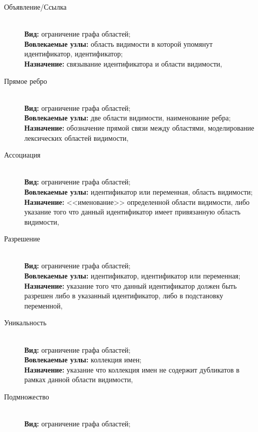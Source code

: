 \begin{description} \label{constraints-desc}
    \item[Объявление\slash Ссылка] \
        \\
        \textbf{Вид:} ограничение графа областей; \\
        \textbf{Вовлекаемые узлы:} область видимости в которой упомянут идентификатор, идентификатор; \\
        \textbf{Назначение:} связывание идентификатора и области видимости,
    \item[Прямое ребро] \
        \\
        \textbf{Вид:} ограничение графа областей; \\
        \textbf{Вовлекаемые узлы:} две области видимости, наименование ребра; \\
        \textbf{Назначение:} обозначение прямой связи
        между областями, моделирование лексических областей видимости,
    \item[Ассоциация] \
        \\
        \textbf{Вид:} ограничение графа областей; \\
        \textbf{Вовлекаемые узлы:} идентификатор или переменная, область видимости; \\
        \textbf{Назначение:} <<именование>> определенной
        области видимости, либо указание того что данный идентификатор имеет привязанную область видимости,
    \item[Разрешение] \
        \\
        \textbf{Вид:} ограничение графа областей; \\
        \textbf{Вовлекаемые узлы:} идентификатор, идентификатор или переменная; \\
        \textbf{Назначение:} указание того что
        данный идентификатор должен быть разрешен либо в указанный идентификатор, либо в подстановку переменной, 
    \item[Уникальность] \
        \\
        \textbf{Вид:} ограничение графа областей; \\
        \textbf{Вовлекаемые узлы:} коллекция имен; \\
        \textbf{Назначение:} указание что коллекция имен не содержит дубликатов
        в рамках данной области видимости, 
    \item[Подмножество] \
        \\
        \textbf{Вид:} ограничение графа областей; \\

\end{description}
